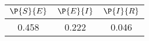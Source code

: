 \begin{tabular}{ccc}
\hline
$\P{S}{E}$&$\P{E}{I}$&$\P{I}{R}$\\
\hline
0.458&0.222&0.046\\
\hline
\end{tabular}